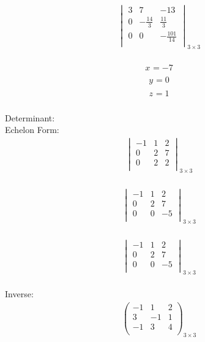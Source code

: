 \documentclass{article}
\begin{document}
\begin{align*}
\begin{vmatrix}
3 & 7 & -13\\
0 & -\frac{14}{3} & \frac{11}{3}\\
0 & 0 & -\frac{101}{14}\\
\end{vmatrix}_{3\times 3}
\end{align*}
\\
\begin{align*}
x_{} = -7\end{align*}
\begin{align*}
y_{} = 0\end{align*}
\begin{align*}
z_{} = 1\end{align*}
\\
Determinant:\\
Echelon Form:\\
\begin{align*}
\begin{vmatrix}
-1 & 1 & 2\\
0 & 2 & 7\\
0 & 2 & 2\\
\end{vmatrix}_{3\times 3}
\end{align*}
\\
\begin{align*}
\begin{vmatrix}
-1 & 1 & 2\\
0 & 2 & 7\\
0 & 0 & -5\\
\end{vmatrix}_{3\times 3}
\end{align*}
\\
\begin{align*}
\begin{vmatrix}
-1 & 1 & 2\\
0 & 2 & 7\\
0 & 0 & -5\\
\end{vmatrix}_{3\times 3}
\end{align*}
\\
Inverse:\\
\begin{align*}
\begin{pmatrix}
-1 & 1 & 2\\
3 & -1 & 1\\
-1 & 3 & 4\\
\end{pmatrix}_{3\times 3}
\end{align*}
\end{document}
